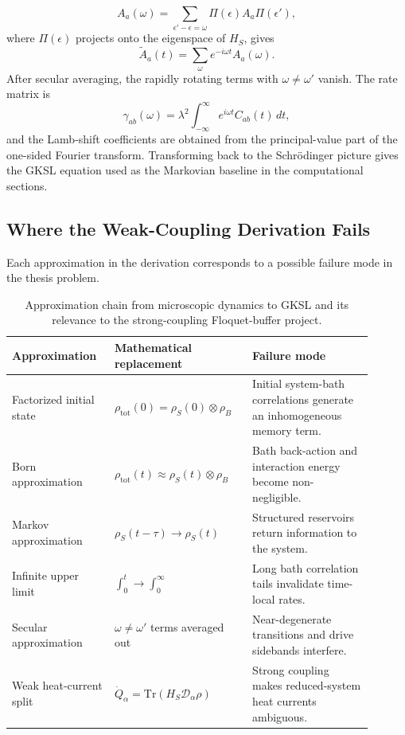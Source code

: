 \documentclass[11pt]{article}
\begin{document}
\begin{equation}
    A_a(\omega)
    =
    \sum_{\epsilon'-\epsilon=\omega}
    \Pi(\epsilon) A_a \Pi(\epsilon'),
\end{equation}
where $\Pi(\epsilon)$ projects onto the eigenspace of $H_S$, gives
\begin{equation}
    \tilde A_a(t)
    =
    \sum_\omega e^{-i\omega t} A_a(\omega).
\end{equation}
After secular averaging, the rapidly rotating terms with $\omega\neq\omega'$ vanish.  The
rate matrix is
\begin{equation}
    \gamma_{ab}(\omega)
    =
    \lambda^2
    \int_{-\infty}^{\infty}
    e^{i\omega t} C_{ab}(t)\,dt ,
\end{equation}
and the Lamb-shift coefficients are obtained from the principal-value part of the one-sided
Fourier transform.  Transforming back to the Schrödinger picture gives the GKSL equation
used as the Markovian baseline in the computational sections.

\subsection{Where the Weak-Coupling Derivation Fails}

Each approximation in the derivation corresponds to a possible failure mode in the thesis
problem.
\begin{table}[H]
\centering
\caption{Approximation chain from microscopic dynamics to GKSL and its relevance to the
strong-coupling Floquet-buffer project.}
\begin{tabular}{p{0.25\linewidth}p{0.34\linewidth}p{0.31\linewidth}}
\toprule
Approximation & Mathematical replacement & Failure mode \\
\midrule
Factorized initial state &
$\rho_{\mathrm{tot}}(0)=\rho_S(0)\otimes\rho_B$ &
Initial system-bath correlations generate an inhomogeneous memory term. \\
Born approximation &
$\rho_{\mathrm{tot}}(t)\approx\rho_S(t)\otimes\rho_B$ &
Bath back-action and interaction energy become non-negligible. \\
Markov approximation &
$\rho_S(t-\tau)\rightarrow\rho_S(t)$ &
Structured reservoirs return information to the system. \\
Infinite upper limit &
$\int_0^t\rightarrow\int_0^\infty$ &
Long bath correlation tails invalidate time-local rates. \\
Secular approximation &
$\omega\neq\omega'$ terms averaged out &
Near-degenerate transitions and drive sidebands interfere. \\
Weak heat-current split &
$\dot Q_\alpha=\mathrm{Tr}(H_S\mathcal{D}_\alpha\rho)$ &
Strong coupling makes reduced-system heat currents ambiguous. \\
\bottomrule
\end{tabular}
\end{table}
\end{document}
